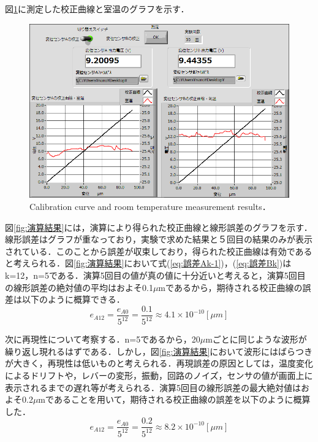 図\ref{fig:測定結果}に測定した校正曲線と室温のグラフを示す．
\begin{figure}[htbp]
    \centering %
    \includegraphics[width=100truemm,clip]{fig/測定結果_D.png}
    \caption{Calibration curve and room temperature measurement results．}
    \label{fig:測定結果}
\end{figure}

図\ref{fig:演算結果}には，演算により得られた校正曲線と線形誤差のグラフを示す．線形誤差はグラフが重なっており，実験で求めた結果と５回目の結果のみが表示されている．このことから誤差が収束しており，得られた校正曲線は有効であると考えられる．図\ref{fig:演算結果}において式(\ref{eq:誤差Ak-1})，(\ref{eq:誤差Bk})はk=12，n=5である．演算5回目の値が真の値に十分近いと考えると，演算5回目の線形誤差の絶対値の平均はおよそ0.1$\mu$mであるから，期待される校正曲線の誤差は以下のように概算できる．
\begin{equation}
    e_{A12} = \frac{e_{A0}}{5^{12}} = \frac{0.1}{5^{12}} \approx 4.1 \times 10^{-10}[\mu m]
\end{equation}

次に再現性について考察する．n=5であるから，20$\mu$mごとに同じような波形が繰り返し現れるはずである．しかし，図\ref{fig:演算結果}において波形にはばらつきが大きく，再現性は低いものと考えられる．再現誤差の原因としては，温度変化によるドリフトや，レバーの変形，振動，回路のノイズ，センサの値が画面上に表示されるまでの遅れ等が考えられる．演算5回目の線形誤差の最大絶対値はおよそ0.2$\mu$mであることを用いて，期待される校正曲線の誤差を以下のように概算した．
\begin{equation}
    e_{A12} = \frac{e_{A0}}{5^{12}} = \frac{0.2}{5^{12}} \approx 8.2 \times 10^{-10}[\mu m]
\end{equation}

